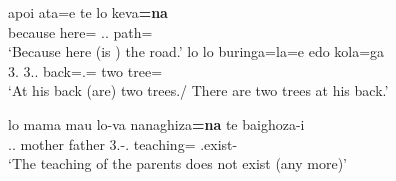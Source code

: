 \begin{exe}\ex\label{SavExist}
\begin{xlist} 
\ex\gll apoi ata=e te lo keva\textbf{=na}\\
because here=\emphat{} \emphat{} \deter{}.\sg{}.\mas{} path=\nom{}\\
`Because here (is ) the road.'
\ex\gll lo lo buringa=la=e edo kola=ga\\
3\sg{}.\mas{} 3\sg{}.\mas{}.\gen{} back=\loc{}.\mas{}=\emphat{} two tree=\pl{}\\
\glt `At his back (are) two trees./ There are two trees at his back.'
\ex\raggedright\gll lo mama mau lo-va nanaghiza\textbf{=na} te baighoza-i\\
\deter{}.\sg{}.\mas{} mother father 3\sg{}.\mas{}-\gen{}.\mas{} teaching=\nom{} \emphat{} \Neg{}.exist-\fin{}\\
\glt `The teaching of the parents does not exist (any more)'
\end{xlist}
\end{exe}





